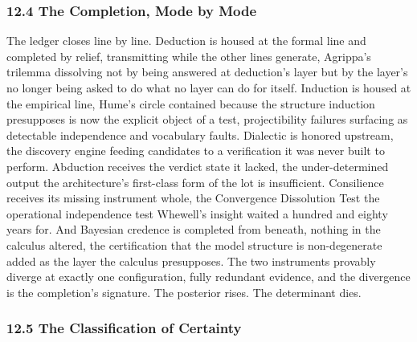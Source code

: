 \documentclass[10pt,twocolumn]{article}
\begin{document}
\hypertarget{the-completion-mode-by-mode}{%
\subsubsection{12.4 The Completion, Mode by
Mode}\label{the-completion-mode-by-mode}}

The ledger closes line by line. Deduction is housed at the formal line
and completed by relief, transmitting while the other lines generate,
Agrippa's trilemma dissolving not by being answered at deduction's layer
but by the layer's no longer being asked to do what no layer can do for
itself. Induction is housed at the empirical line, Hume's circle
contained because the structure induction presupposes is now the
explicit object of a test, projectibility failures surfacing as
detectable independence and vocabulary faults. Dialectic is honored
upstream, the discovery engine feeding candidates to a verification it
was never built to perform. Abduction receives the verdict state it
lacked, the under-determined output the architecture's first-class form
of the lot is insufficient. Consilience receives its missing instrument
whole, the Convergence Dissolution Test the operational independence
test Whewell's insight waited a hundred and eighty years for. And
Bayesian credence is completed from beneath, nothing in the calculus
altered, the certification that the model structure is non-degenerate
added as the layer the calculus presupposes. The two instruments
provably diverge at exactly one configuration, fully redundant evidence,
and the divergence is the completion's signature. The posterior rises.
The determinant dies.

\hypertarget{the-classification-of-certainty}{%
\subsubsection{12.5 The Classification of
Certainty}\label{the-classification-of-certainty}}
\end{document}
